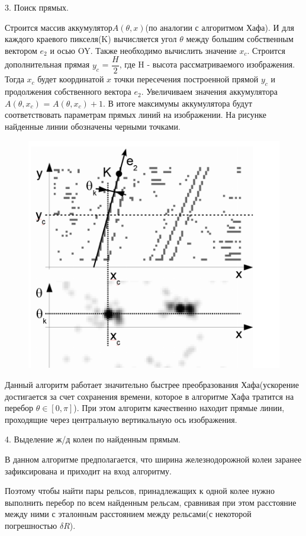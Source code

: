 3. Поиск прямых.

Строится массив аккумулятор$A(\theta, x)$(по аналогии с алгоритмом Хафа\cite{b:hough_transform}). И для каждого краевого пикселя(K) вычисляется угол $\theta$ между большим собственным вектором $e_2$ и осью OY. 
Также необходимо вычислить значение $x_c$. Строится дополнительная прямая $y_c$ = $\dfrac{H}{2}$, где H - высота рассматриваемого изображения. Тогда $x_c$ будет координатой $x$ точки пересечения построенной прямой $y_c$ и продолжения собственного вектора $e_2$.
Увеличиваем значения аккумулятора $A(\theta, x_c)$ = $A(\theta, x_c) + 1$.
В итоге максимумы аккумулятора будут соответствовать параметрам прямых линий на изображении. На рисунке найденные линии обозначены черными точками.
\begin{figure}[!h]
	\centering
	\includegraphics[width=0.5\linewidth]{pictures/screenshot004}
	\caption{}
	\label{fig:screenshot004}
\end{figure}
\newpage
Данный алгоритм работает значительно быстрее преобразования Хафа(ускорение достигается за счет сохранения времени, которое в алгоритме Хафа тратится на перебор $\theta \in [0, \pi]$).
При этом алгоритм качественно находит прямые линии, проходящие через центральную вертикальную ось изображения.

4. Выделение ж/д колеи по найденным прямым.

В данном алгоритме предполагается, что ширина железнодорожной колеи заранее зафиксирована и приходит на вход алгоритму. 

Поэтому чтобы найти пары рельсов, принадлежащих к одной колее нужно выполнить перебор по всем найденным рельсам, сравнивая при этом расстояние между ними с эталонным расстоянием между рельсами(с некоторой погрешностью $\delta R$).

